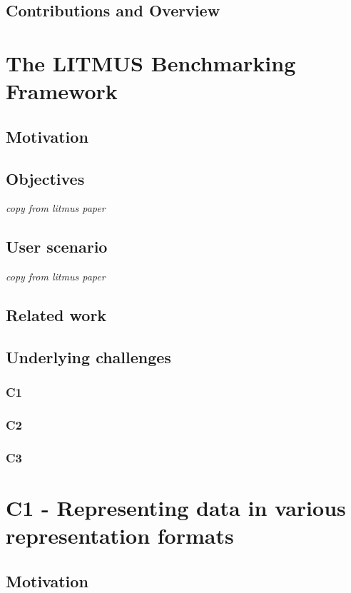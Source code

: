 \documentclass{article}
\begin{document}
\subsection{Contributions and Overview}


\section{The LITMUS Benchmarking Framework}
\subsection{Motivation}
\subsection{Objectives}
\textit{copy from litmus paper}

\subsection{User scenario}
\textit{copy from litmus paper}

\subsection{Related work}

\subsection{Underlying challenges}
\subsubsection{C1}
\subsubsection{C2}
\subsubsection{C3}



\section{C1 - Representing data in various representation formats}
\subsection{Motivation}
\end{document}
